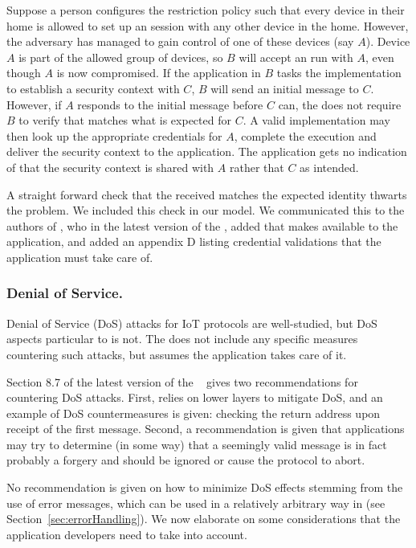 \documentclass[runningheads]{llncs}
\begin{document}
Suppose a person configures the restriction policy such that every device in
their home is allowed to set up an \mEdhoc{} session with any other device in
the home.
%
However, the adversary has managed to gain control of one of these devices (say
$A$).
%
Device $A$ is part of the allowed group of devices, so $B$ will accept an
\mEdhoc{} run with $A$, even though $A$ is now compromised.
%
If the application in $B$ tasks the \mEdhoc{} implementation to establish a
security context with $C$, $B$ will send an initial message to $C$.
%
However, if $A$ responds to the initial message before $C$ can, the \mSpec{}
does not require $B$ to verify that \mIdcredr{} matches what is expected for
$C$.
%
A valid \mEdhoc{} implementation may then look up the appropriate credentials
for $A$, complete the execution and deliver the security context to the
application.
%
The application gets no indication of that the security context is shared with
$A$ rather that $C$ as intended.
%

A straight forward check that the received \mIdcredr{} matches the expected
identity thwarts the problem.
%
We included this check in our model.
%
We communicated this to the authors of \mEdhoc{}, who in the latest version of
the \mSpec{}, added that \mEdhoc{} makes \mIdcredr{} available to the
application, and added an appendix D listing credential validations that
the application must take care of.
%

\subsubsection{Denial of Service.}
Denial of Service (DoS) attacks for IoT protocols are well-studied,
but DoS aspects particular to \mEdhoc{} is not.
%
The \mSpec{} does not include any specific measures countering such
attacks, but assumes the application takes care of it.

Section 8.7 of the latest version of the \mEdhoc{}
\mSpec{}~\cite{draft-ietf-lake-edhoc-15}
gives two recommendations for countering DoS attacks.
%
First, \mEdhoc{} relies on lower layers to mitigate DoS, and an example of DoS
countermeasures is given: checking the return address upon receipt of the first
message.
%
Second, a recommendation is given that applications may try to determine (in
some way) that a seemingly valid message is in fact probably a forgery and
should be ignored or cause the protocol to abort.
%

No recommendation is given on how to minimize DoS effects stemming from the use
of error messages, which can be used in a relatively arbitrary way in \mEdhoc{}
(see Section~\ref{sec:errorHandling}).
%
We now elaborate on some considerations that the application developers need to
take into account.
%
\end{document}
